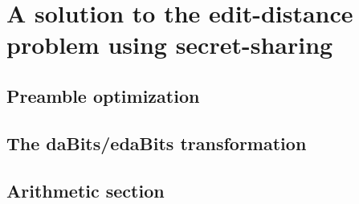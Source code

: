 \chapter{A solution to the edit-distance problem using secret-sharing}
\label{sec:solution}

\section{Preamble optimization}
\label{sec:preamble}

\section{The daBits/edaBits transformation}
\label{sec:dabits_edabits_transformation}

\section{Arithmetic section}
\label{sec:arithmetic}